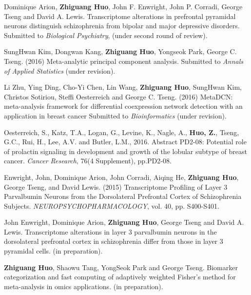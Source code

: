 \documentclass[a4paper, 10pt]{article}
\begin{document}
\begin{thebibliography}{9}
Dominique Arion, {\bf Zhiguang Huo}, John F. Enwright, John P. Corradi, George Tseng and David A. Lewis.
Transcriptome alterations in prefrontal pyramidal neurons distinguish schizophrenia from bipolar and major depressive disorders.
Submitted to \emph{Biological Psychiatry}, (under second round of review).

SungHwan Kim, Dongwan Kang, {\bf Zhiguang Huo}, Yongseok
Park, George C. Tseng. (2016)
Meta-analytic principal component analysis.
Submitted to \emph{Annals of Applied Statistics} (under revision).

Li Zhu, Ying Ding, Cho-Yi Chen, Lin Wang, {\bf Zhiguang Huo}, SungHwan Kim, Christos Sotiriou, Steffi Oesterreich and George C. Tseng. (2016)
MetaDCN: meta-analysis framework for differential coexpression network detection with an application in breast cancer
Submitted to \emph{Bioinformatics} (under revision).

Oesterreich, S., Katz, T.A., Logan, G., Levine, K., Nagle, A., {\bf Huo, Z.}, Tseng, G.C., Rui, H., Lee, A.V. and Butler, L.M., 2016. Abstract PD2-08: Potential role of prolactin signaling in development and growth of the lobular subtype of breast cancer. \emph{Cancer Research}, 76(4 Supplement), pp.PD2-08.

Enwright, John, Dominique Arion, John Corradi, Aiqing He, {\bf Zhiguang Huo}, George Tseng, and David Lewis. (2015) Transcriptome Profiling of Layer 3 Parvalbumin Neurons from the Dorsolateral Prefrontal Cortex of Schizophrenia Subjects.
\emph{NEUROPSYCHOPHARMACOLOGY}, vol. 40, pp. S400-S401. 

John Enwright,  Dominique Arion, {\bf Zhiguang Huo}, George Tseng and David A. Lewis. 
Transcriptome alterations in layer 3 parvalbumin neurons in the dorsolateral prefrontal cortex in schizophrenia differ from those in layer 3 pyramidal cells.
(in preparation).

{\bf Zhiguang Huo}, Shaowu Tang, YongSeok Park and George Tseng. 
Biomarker categorization and fast computing of adaptively weighted Fisher's method for meta-analysis in omics applications.
(in preparation).

\end{thebibliography}
\end{document}
